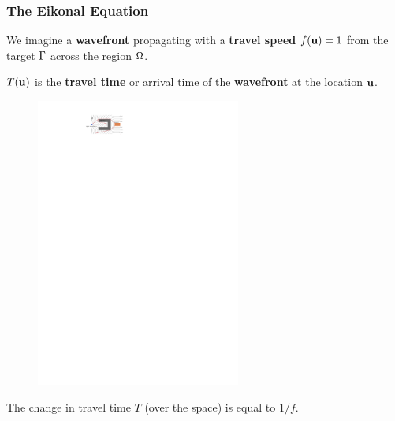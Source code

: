\documentclass[aspectratio=169,handout]{beamer}
\begin{document}
\begin{frame}
	\frametitle{The Eikonal Equation}
	We imagine a \textbf{wavefront} propagating with a \textbf{travel speed} $f(\mathbf{u}) = 1$ from the target $\Gamma$ across the region $\Omega$.\\
	\vspace{0.25cm}
	
	$T(\mathbf{u})$ is the \textbf{travel time} or arrival time of the \textbf{wavefront} at the location $\mathbf{u}$.
	
	\begin{figure}
		\includegraphics[width=0.6\textwidth]{./figs/chicken-eikonal_en.pdf}
	\end{figure}
	The change in travel time $T$ (over the space) is equal to $1/f$.
\end{frame}
\end{document}
